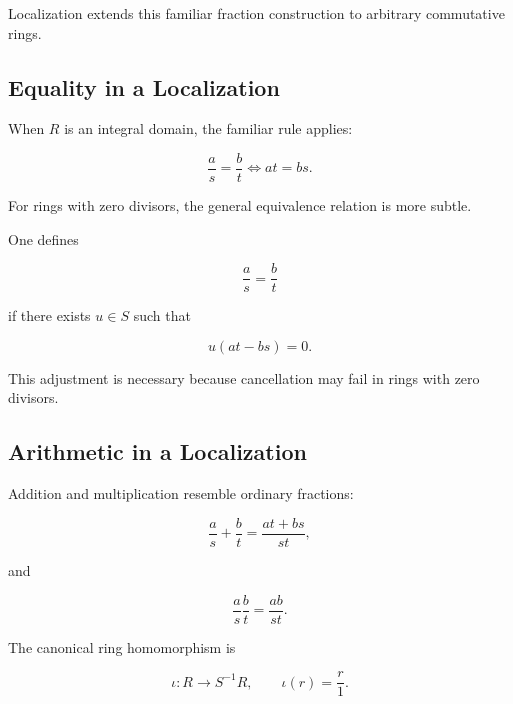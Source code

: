 \begin{center}
\end{center}

Localization extends this familiar fraction construction to arbitrary
commutative rings.

\subsection{Equality in a Localization}
\label{subsec:equality-localization}

When \(R\) is an integral domain, the familiar rule applies:

\[ \frac{a}{s}=\frac{b}{t}\iff at=bs. \]

For rings with zero divisors, the general equivalence relation is more
subtle.

One defines

\[ \frac{a}{s}=\frac{b}{t} \]

if there exists \(u\in S\) such that

\[ u(at-bs)=0. \]

This adjustment is necessary because cancellation may fail in rings with
zero divisors.

\subsection{Arithmetic in a Localization}
\label{subsec:localization-arithmetic}

Addition and multiplication resemble ordinary fractions:

\[ \frac{a}{s}+\frac{b}{t}=\frac{at+bs}{st}, \]

and

\[ \frac{a}{s}\frac{b}{t}=\frac{ab}{st}. \]

The canonical ring homomorphism is

\[ \iota:R\to S^{-1}R,\qquad \iota(r)=\frac{r}{1}. \]

